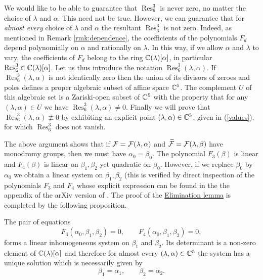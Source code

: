 We would like to be able to guarantee that $\operatorname{Res}^3_6$ is never zero, no matter the choice of $\lambda$ and $\alpha$. This need not be true. However, we can guarantee that for \emph{almost every} choice of $\lambda$ and $\alpha$ the resultant $\operatorname{Res}^3_6$ is not zero. Indeed, as mentioned in Remark \ref{rmk:dependence}, the coefficients of the polynomials $F_d$ depend polynomially on $\alpha$ and rationally on $\lambda$. In this way, if we allow $\alpha$ and $\lambda$ to vary, the coefficients of $F_d$ belong to the ring $\mathbb{C}(\lambda)[\alpha]$, in particular $\operatorname{Res}^3_6\in\mathbb{C}(\lambda)[\alpha]$. Let us thus introduce the notation $\operatorname{Res}^3_6(\lambda,\alpha)$. If $\operatorname{Res}^3_6(\lambda,\alpha)$ is not identically zero then the union of its divisors of zeroes and poles defines a proper algebraic subset of affine space $\mathbb{C}^5$. The complement $U$ of this algebraic set is a Zariski-open subset of $\mathbb{C}^5$ with the property that for any $(\lambda,\alpha)\in U$ we have $\operatorname{Res}^3_6(\lambda,\alpha)\neq 0$. Finally we will prove that $\operatorname{Res}^3_6(\lambda,\alpha)\not\equiv 0$ by exhibiting an explicit point $(\lambda,\alpha)\in\mathbb{C}^5$, given in (\ref{values}), for which $\operatorname{Res}^3_6$ does not vanish. 

The above argument shows that if $\mathcal{F}=\mathcal{F}(\lambda,\alpha)$ and $\widetilde{\mathcal{F}}=\mathcal{F}(\lambda,\beta)$ have  monodromy groups, then we must have $\alpha_0=\beta_0$. The polynomial $F_3(\beta)$ is linear and $F_4(\beta)$ is linear on $\beta_1,\beta_2$ yet quadratic on $\beta_0$. However, if we replace $\beta_0$ by $\alpha_0$ we obtain a linear system on $\beta_1,\beta_2$ (this is verified by direct inspection of the polynomials $F_3$ and $F_4$ whose explicit expression can be found in the the appendix of the arXiv version of \cite{UtmostRigidity}. The proof of the \hyperref[lemma:elimination]{Elimination lemma} is completed by the following proposition.

\begin{proposition}\label{prop:elimination2}
The pair of equations
\begin{equation}\label{eq:elimination2}
F_3(\alpha_0,\beta_1,\beta_2)=0,\qquad F_4(\alpha_0,\beta_1,\beta_2)=0,
\end{equation}
forms a linear inhomogeneous system on $\beta_1$ and $\beta_2$. Its determinant is a non-zero element of $\mathbb{C}(\lambda)[\alpha]$ and therefore for almost every $(\lambda,\alpha)\in\mathbb{C}^5$ the system has a unique solution which is necessarily given by 
\[ \beta_1=\alpha_1, \qquad \beta_2=\alpha_2. \]
\end{proposition}

